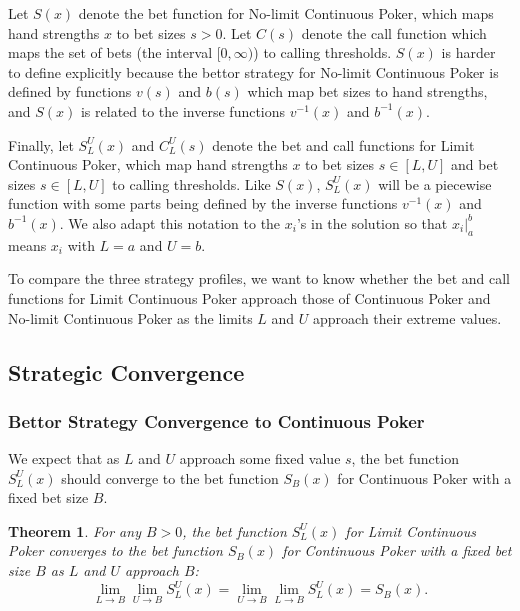 \documentclass[a4paper,12pt]{article}
\theoremstyle{plain}
\newtheorem{theorem}{Theorem}[section]
\theoremstyle{definition}
\begin{document}
Let $S(x)$ denote the bet function for No-limit Continuous Poker, which maps hand strengths $x$ to bet sizes $s > 0$. Let $C(s)$ denote the call function which maps the set of bets (the interval $[0, \infty)$) to calling thresholds. $S(x)$ is harder to define explicitly because the bettor strategy for No-limit Continuous Poker is defined by functions $v(s)$ and $b(s)$ which map bet sizes to hand strengths, and $S(x)$ is related to the inverse functions $v^{-1}(x)$ and $b^{-1}(x)$. 

Finally, let $S_L^U(x)$ and $C_L^U(s)$ denote the bet and call functions for Limit Continuous Poker, which map hand strengths $x$ to bet sizes $s \in [L, U]$ and bet sizes $s \in [L, U]$ to calling thresholds. Like $S(x)$, $S_L^U(x)$ will be a piecewise function with some parts being defined by the inverse functions $v^{-1}(x)$ and $b^{-1}(x)$. We also adapt this notation to the $x_i$'s in the solution so that $x_i|_a^b$ means $x_i$ with $L=a$ and $U=b$.

To compare the three strategy profiles, we want to know whether the bet and call functions for Limit Continuous Poker approach those of Continuous Poker and No-limit Continuous Poker as the limits $L$ and $U$ approach their extreme values.

\subsection{Strategic Convergence}
\label{sec:strategic_convergence}

\subsubsection{Bettor Strategy Convergence to Continuous Poker}
We expect that as $L$ and $U$ approach some fixed value $s$, the bet function $S_L^U(x)$ should converge to the bet function $S_B(x)$ for Continuous Poker with a fixed bet size $B$. 

\begin{theorem}
	 For any $B > 0$, the bet function $S_L^U(x)$ for Limit Continuous Poker converges to the bet function $S_B(x)$ for Continuous Poker with a fixed bet size $B$ as $L$ and $U$ approach $B$:
\[
\lim_{L \to B} \lim_{U \to B} S_L^U(x) = \lim_{U \to B} \lim_{L \to B} S_L^U(x) = S_B(x).
\]
\end{theorem}
\end{document}
